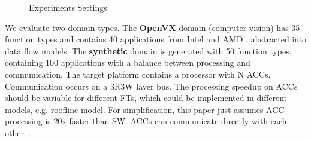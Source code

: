 \begin{figure}[h]
	\centering
		\hfill
		\hfill
	\caption{Experiments Settings}
\end{figure}



We evaluate two domain types. The \textbf{OpenVX} domain (computer vision) has 35 function types and contains 40 applications from Intel \cite{Intel} and AMD \cite{AMD}, abstracted into data flow models. The \textbf{synthetic} domain is generated with 50 function types, containing 100 applications with a balance between processing and communication. 
The target platform contains a processor with N ACCs. Communication occurs on a 3R3W layer bus. The processing speedup on ACCs should be variable for different FTs, which could be implemented in different models, e.g. roofline model. For simplification, this paper just assumes ACC processing is 20x faster than SW. ACCs can communicate directly with each other~\cite{teimouri2016improving}.
